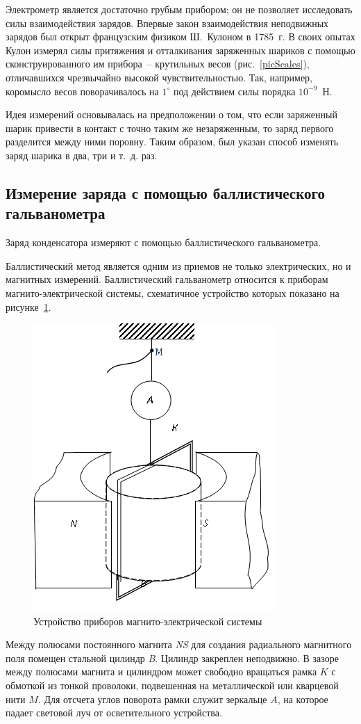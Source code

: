 \documentclass[pscyr]{hedwork}
\begin{document}
  Электрометр является достаточно грубым прибором; он не позволяет исследовать
  силы взаимодействия зарядов. Впервые закон взаимодействия неподвижных зарядов
  был открыт французским физиком Ш.~Кулоном в 1785~г. В своих опытах Кулон
  измерял силы притяжения и отталкивания заряженных шариков с помощью
  сконструированного им прибора~-- крутильных весов (рис.~\ref{picScales}),
  отличавшихся чрезвычайно высокой чувствительностью. Так, например, коромысло
  весов поворачивалось на \( 1^\circ \) под действием силы порядка
  \( 10^{-9} \)~Н.

  Идея измерений основывалась на предположении о том, что если заряженный шарик
  привести в контакт с точно таким же незаряженным, то заряд первого разделится
  между ними поровну. Таким образом, был указан способ изменять заряд шарика в
  два, три и т.~д. раз.

  \subsection{Измерение заряда с помощью баллистического гальванометра}

  Заряд конденсатора измеряют с помощью баллистического гальванометра.

  Баллистический метод является одним из приемов не только электрических, но и
  магнитных измерений. Баллистический гальванометр относится к приборам
  магнито-электрической системы, схематичное устройство которых показано на
  рисунке~\ref{picGalv}.

  \begin{figure}[ht]
    \center
    \includegraphics[width=.4\textwidth]{sl_3_1}
    \caption{Устройство приборов магнито-электрической системы}
    \label{picGalv}
  \end{figure}

  Между полюсами постоянного магнита \emph{NS} для создания радиального
  магнитного поля помещен стальной цилиндр \emph{B}. Цилиндр закреплен
  неподвижно. В зазоре между полюсами магнита и цилиндром может свободно
  вращаться рамка \( K \) с обмоткой из тонкой проволоки, подвешенная на
  металлической или кварцевой нити \( M \). Для отсчета углов поворота рамки
  служит зеркальце \( A \), на которое падает световой луч от осветительного
  устройства.
\end{document}
